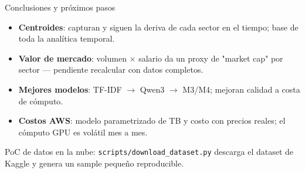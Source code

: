 \documentclass[aspectratio=169]{beamer}
\begin{document}
\begin{frame}{Conclusiones y próximos pasos}
  \begin{itemize}
    \item \textbf{Centroides}: capturan y siguen la deriva de cada sector en el
          tiempo; base de toda la analítica temporal.
    \item \textbf{Valor de mercado}: volumen $\times$ salario da un proxy de
          "market cap" por sector --- pendiente recalcular con datos completos.
    \item \textbf{Mejores modelos}: TF-IDF $\rightarrow$ Qwen3 $\rightarrow$
          M3/M4; mejoran calidad a costa de cómputo.
    \item \textbf{Costos AWS}: modelo parametrizado de TB y costo con precios
          reales; el cómputo GPU es volátil mes a mes.
  \end{itemize}
  \vfill
  \footnotesize PoC de datos en la nube: \texttt{scripts/download\_dataset.py}
  descarga el dataset de Kaggle y genera un sample pequeño reproducible.
\end{frame}
\end{document}
